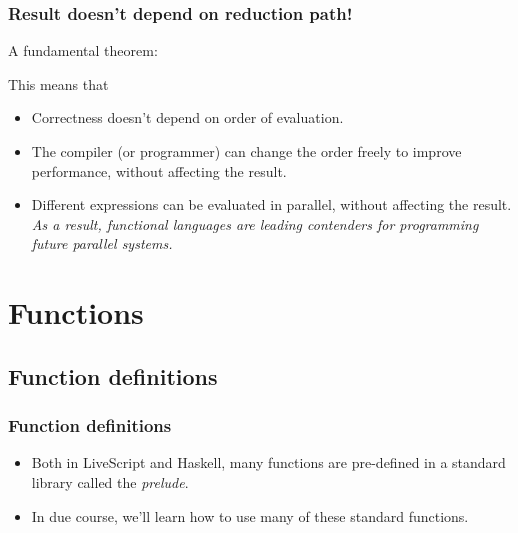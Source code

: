 \documentclass{beamer}
\begin{document}
\begin{frame}
\frametitle{Result doesn't depend on reduction path!}

A fundamental theorem:

\begin{center}
\end{center}

This means that
\begin{itemize}
\item Correctness doesn't depend on order of evaluation.
\item The compiler (or programmer) can change the order freely to
  improve performance, without affecting the result.
\item Different expressions can be evaluated in parallel, without
  affecting the result.  {\redtext \emph{As a result, functional
      languages are leading contenders for programming future
      parallel systems.}}
\end{itemize}

\end{frame}

\section{Functions}

\subsection{Function definitions}

\begin{frame}[fragile]
\frametitle{Function definitions}

\begin{itemize}
\item Both in LiveScript and Haskell, many functions are pre-defined in a standard
  library called the  \emph{prelude}.%
\item In due course, we'll learn how to use many of these standard
  functions.
\end{itemize}

\end{frame}
\end{document}
